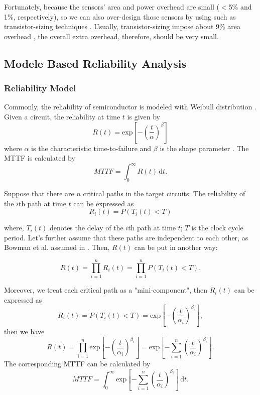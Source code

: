 Fortunately, because the sensors' area and power overhead are small ($<$5\% and 1\%, respectively), so we can also over-design those sensors by using such as transistor-sizing techniques \cite{Temporal-Performance-Degradation-date06}. Usually, transistor-sizing impose about 9\% area overhead \cite{Temporal-Performance-Degradation-date06}, the overall extra overhead, therefore, should be very small.


\subsection {Modele Based Reliability Analysis}\label{section_model}

\subsubsection{Reliability Model}
Commonly, the reliability of semiconductor is modeled with Weibull distribution \cite{Handbook}. Given a circuit, the reliability at  time $t$ is given by
\begin{equation}\label{weibull}
  R(t)=\mbox{exp}[-(\frac{t}{\alpha})^\beta]
\end{equation}
where $\alpha$ is the characteristic time-to-failure and $\beta$ is the shape parameter \cite{Handbook}. The MTTF is calculated by
\begin{equation}
MTTF=\int^\infty_0 R(t)\,\mbox{d}t.
\end{equation}

Suppose that there are $n$ critical paths in the target circuits. The reliability of the $i$th path at time $t$ can be expressed as
\begin{equation}
  R_i(t)=P(T_i(t)<T)
\end{equation}

where, $T_i(t)$ denotes the delay of the $i$th path at time $t$; $T$ is the clock cycle period. Let's further assume that these paths are independent to each other, as Bowman et al. assumed in \cite{variation_jssc02}. Then, $R(t)$ can be put in another way:

\begin{equation}\label{anotherway}
  R(t)=\prod^n_{i=1} R_i(t)=\prod^n_{i=1} P(T_i(t)<T).
\end{equation}

Moreover, we treat each critical path as a "mini-component", then $R_i(t)$ can be expressed as
\begin{equation}
  R_i(t)=P(T_i(t)<T)=\mbox{exp}[-(\frac{t}{\alpha_i})^{\beta_i}],
\end{equation}
then we have
\begin{equation}
  R(t)=\prod^n_{i=1}
  \mbox{exp}[-(\frac{t}{\alpha_i})^{\beta_i}]=\mbox{exp}[-\sum^n_{i=1}(\frac{t}{\alpha_i})^{\beta_i}].
\end{equation}
The corresponding MTTF can be calculated by
\begin{equation}\label{mttf}
  MTTF=\int^{\infty}_{0} \mbox{exp}[-\sum^n_{i=1}(\frac{t}{\alpha_i})^{\beta_i}]\,\mbox{d}t.
\end{equation}

